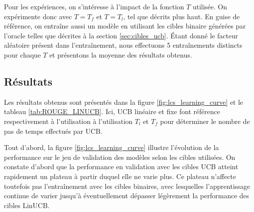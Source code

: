 Pour les expériences, on s'intéresse à
l'impact de la fonction $T$ utilisée.
On expérimente donc avec $T = T_f$ et $T=T_l$,
tel que décrits plus haut.
En guise de référence, on entraîne aussi un modèle 
en utilisant les cibles binaire générées par l'oracle telles que décrites
à la section \ref{sec:cibles_ucb}.
Étant donné le facteur aléatoire présent dans l'entraînement, nous effectuons 
5 entraînements distincts pour chaque $T$ et présentons la moyenne
des résultats obtenus.

\subsection{Résultats}

Les résultats obtenus sont présentés dans la figure \ref{fig:lcs_learning_curve} 
et le tableau \ref{tab:ROUGE_LINUCB}.
Ici, UCB linéaire et fixe font référence respectivement à l'utilisation
à l'utilisation $T_l$ et $T_f$ pour déterminer le nombre de pas de temps
effectués par UCB.

Tout d'abord, la figure \ref{fig:lcs_learning_curve} illustre l'évolution 
de la performance sur le jeu de validation des modèles selon 
les cibles utilisées.
On constate d'abord que la performance en validation avec les cibles 
UCB atteint rapidement un plateau à partir duquel elle 
ne varie plus.
Ce plateau n'affecte toutefois pas l'entraînement avec les cibles binaires,
avec lesquelles l'apprentissage continue de varier jusqu'à
éventuellement dépasser légèrement la performance des cibles LinUCB.

